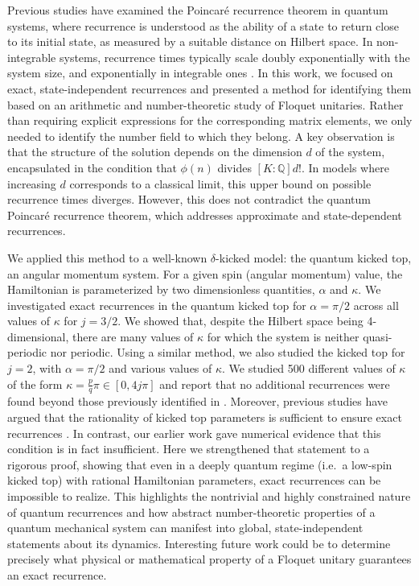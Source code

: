 \documentclass[a4paper,onecolumn,accepted=2026-04-08,10pt]{quantumarticle}
\theoremstyle{definition}
\begin{document}
Previous studies have examined the Poincaré recurrence theorem in quantum systems, where recurrence is understood as the ability of a state to return close to its initial state, as measured by a suitable distance on Hilbert space. In non-integrable systems, recurrence times typically scale doubly exponentially with the system size, and exponentially in integrable ones \cite{venuti_2015_the}. 
In this work, we focused on exact, state-independent recurrences and presented a method for identifying them based on an arithmetic and number-theoretic study of Floquet unitaries.  Rather than requiring explicit expressions for the corresponding matrix elements, we only needed to identify the number field to which they belong. A key observation is that the structure of the solution depends on the dimension $d$ of the system, encapsulated in the condition that $\phi(n)$ divides $[K:\mathbb{Q}]d!$. 
In models where increasing $d$ corresponds to a classical limit,
this upper bound on possible recurrence times diverges. However, this does not contradict the quantum Poincaré recurrence theorem, which addresses approximate and state-dependent recurrences.


We applied this method to a well-known $\delta$-kicked model: the quantum kicked top, an angular momentum system. For a given spin (angular momentum) value, the Hamiltonian is parameterized by two dimensionless quantities, $\alpha$ and $\kappa$. We investigated exact recurrences in the quantum kicked top for $\alpha = \pi/2$ across all values of $\kappa$ for $j = 3/2$. We showed that, despite the Hilbert space being 4-dimensional, there are many values of $\kappa$ for which the system is neither quasi-periodic nor periodic. 
Using a similar method, we also studied the kicked top for $j = 2$, with $\alpha = \pi/2$ and various values of $\kappa$. We studied 500 different values of $\kappa$ of the form $\kappa=\frac{p}{q} \pi \in [0,4j\pi]$ and report that no additional recurrences were found beyond those previously identified in \cite{anand_davis_ghose_2024}.
Moreover, previous studies have argued that the rationality of kicked top parameters is sufficient to ensure exact recurrences \cite{Ruebeck_Pattanayak_2017}. In contrast, our earlier work \cite{anand_davis_ghose_2024} gave numerical evidence that this condition is in fact insufficient. Here we strengthened that statement to a rigorous proof, showing that even in a deeply quantum regime (i.e.\ a low-spin kicked top) with rational Hamiltonian parameters, exact recurrences can be impossible to realize.  This highlights the nontrivial and highly constrained nature of quantum recurrences and how abstract number-theoretic properties of a quantum mechanical system can manifest into global, state-independent statements about its dynamics.  Interesting future work could be to determine precisely what physical or mathematical property of a Floquet unitary guarantees an exact recurrence.
\end{document}
